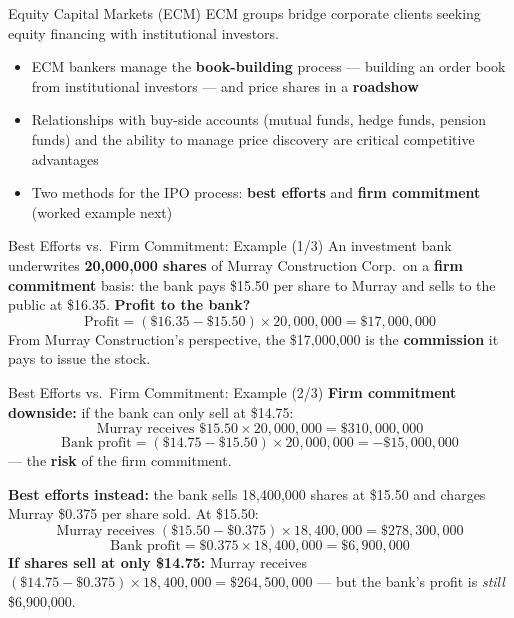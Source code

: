 \documentclass[aspectratio=169]{beamer}
\begin{document}
\begin{frame}{Equity Capital Markets (ECM)}
ECM groups bridge corporate clients seeking equity financing with institutional investors.
\begin{itemize}
  \item ECM bankers manage the \textbf{book-building} process --- building an order book from institutional investors --- and price shares in a \textbf{roadshow}
  \item Relationships with buy-side accounts (mutual funds, hedge funds, pension funds) and the ability to manage price discovery are critical competitive advantages
  \item Two methods for the IPO process: \textbf{best efforts} and \textbf{firm commitment} (worked example next)
\end{itemize}
\end{frame}

\begin{frame}{Best Efforts vs.\ Firm Commitment: Example (1/3)}
An investment bank underwrites \textbf{20{,}000{,}000 shares} of Murray Construction Corp.\ on a \textbf{firm commitment} basis: the bank pays \$15.50 per share to Murray and sells to the public at \$16.35. \textbf{Profit to the bank?}
\[
\text{Profit} = (\$16.35 - \$15.50) \times 20{,}000{,}000 = \$17{,}000{,}000
\]
From Murray Construction's perspective, the \$17{,}000{,}000 is the \textbf{commission} it pays to issue the stock.
\end{frame}

\begin{frame}{Best Efforts vs.\ Firm Commitment: Example (2/3)}
\textbf{Firm commitment downside:} if the bank can only sell at \$14.75:
\[
\text{Murray receives } \$15.50 \times 20{,}000{,}000 = \$310{,}000{,}000
\]
\[
\text{Bank profit} = (\$14.75 - \$15.50) \times 20{,}000{,}000 = -\$15{,}000{,}000
\]
--- the \textbf{risk} of the firm commitment.
\vspace{0.2em}

\textbf{Best efforts instead:} the bank sells 18{,}400{,}000 shares at \$15.50 and charges Murray \$0.375 per share sold. At \$15.50:
\[
\text{Murray receives } (\$15.50 - \$0.375) \times 18{,}400{,}000 = \$278{,}300{,}000
\]
\[
\text{Bank profit} = \$0.375 \times 18{,}400{,}000 = \$6{,}900{,}000
\]
\textbf{If shares sell at only \$14.75:} Murray receives $(\$14.75 - \$0.375) \times 18{,}400{,}000 = \$264{,}500{,}000$ --- but the bank's profit is \emph{still} \$6{,}900{,}000.
\end{frame}
\end{document}
